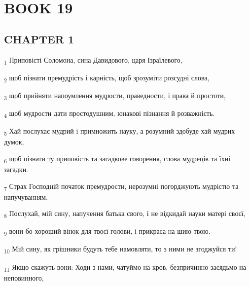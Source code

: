 \section{BOOK 19}
\subsection{CHAPTER 1}
\begin{tcolorbox}
\textsubscript{1} Приповісті Соломона, сина Давидового, царя Ізраїлевого,
\end{tcolorbox}
\begin{tcolorbox}
\textsubscript{2} щоб пізнати премудрість і карність, щоб зрозуміти розсудні слова,
\end{tcolorbox}
\begin{tcolorbox}
\textsubscript{3} щоб прийняти напоумлення мудрости, праведности, і права й простоти,
\end{tcolorbox}
\begin{tcolorbox}
\textsubscript{4} щоб мудрости дати простодушним, юнакові пізнання й розважність.
\end{tcolorbox}
\begin{tcolorbox}
\textsubscript{5} Хай послухає мудрий і примножить науку, а розумний здобуде хай мудрих думок,
\end{tcolorbox}
\begin{tcolorbox}
\textsubscript{6} щоб пізнати ту приповість та загадкове говорення, слова мудреців та їхні загадки.
\end{tcolorbox}
\begin{tcolorbox}
\textsubscript{7} Страх Господній початок премудрости, нерозумні погорджують мудрістю та напучуванням.
\end{tcolorbox}
\begin{tcolorbox}
\textsubscript{8} Послухай, мій сину, напучення батька свого, і не відкидай науки матері своєї,
\end{tcolorbox}
\begin{tcolorbox}
\textsubscript{9} вони бо хороший вінок для твоєї голови, і прикраса на шию твою.
\end{tcolorbox}
\begin{tcolorbox}
\textsubscript{10} Мій сину, як грішники будуть тебе намовляти, то з ними не згоджуйся ти!
\end{tcolorbox}
\begin{tcolorbox}
\textsubscript{11} Якщо скажуть вони: Ходи з нами, чатуймо на кров, безпричинно засядьмо на неповинного,
\end{tcolorbox}
